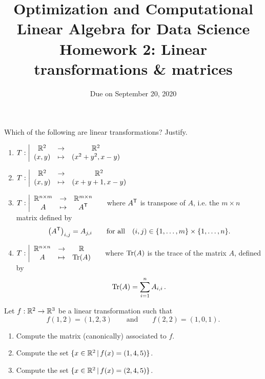 \documentclass[11pt,nocut]{article}
\title{\vspace{-2.0cm}%
	Optimization and Computational Linear Algebra for Data Science\\
Homework 2: Linear transformations \& matrices}
\date{\vspace{-1cm}Due on September 20, 2020}
\begin{document}
\maketitle


\begin{problem}[2 points]
	Which of the following are linear transformations? Justify.
	\begin{enumerate}[label=\normalfont(\textbf{\alph*})]
		\item 
			$\displaystyle
			T: \left| 
			\begin{array}{ccc}
				\mathbb{R}^2 & \to & \mathbb{R}^2 \\
				(x,y) & \mapsto & (x^2+y^2, x-y)
			\end{array}
		\right.
		$
		\item 
			$\displaystyle
			T: \left| 
			\begin{array}{ccc}
				\mathbb{R}^2 & \to & \mathbb{R}^2 \\
				(x,y) & \mapsto & (x+y+1, x-y)
			\end{array}
		\right.
		$
	\item 
			$\displaystyle
			T: \left| 
			\begin{array}{ccc}
				\mathbb{R}^{n \times m} & \to & \mathbb{R}^{m \times n} \\
				A & \mapsto & A^{{\sf T}}
			\end{array}
		\right.
		\quad$ where $A^{{\sf T}}$ is transpose of $A$, i.e. the $m \times n$ matrix defined by
		$$
		\big(A^{{\sf T}}\big)_{i,j} = A_{j,i} \qquad \text{for all} \quad (i,j) \in \{1, \dots, m\}\times \{1, \dots, n\}.
		$$
	\item 
			$\displaystyle
			T: \left| 
			\begin{array}{ccc}
				\mathbb{R}^{n \times n} & \to & \mathbb{R} \\
				A & \mapsto & {{\rm Tr}}(A)
			\end{array}
		\right.\quad$ where ${{\rm Tr}}(A)$ is the trace of the matrix $A$, defined by 
		$${{\rm Tr}}(A) = \sum_{i=1}^n A_{i,i} \,.$$
	\end{enumerate}
\end{problem}

\vspace{5mm}

\begin{problem}[3 points]
	Let $f: \mathbb{R}^2 \to \mathbb{R}^3$ be a linear transformation such that
	$$
	f(1,2) = (1,2,3)
	\qquad \text{and} \qquad f(2,2) = (1,0,1).
	$$
	\begin{enumerate}[label=\normalfont(\textbf{\alph*})]
		\item Compute the matrix (canonically) associated to $f$.
		\item Compute the set $\{x \in \mathbb{R}^2 \, | \, f(x) = (1,4,5) \}$.
		\item Compute the set $\{x \in \mathbb{R}^2 \, | \, f(x) = (2,4,5) \}$.
	\end{enumerate}
\end{problem}
\vspace{5mm}
\end{document}
